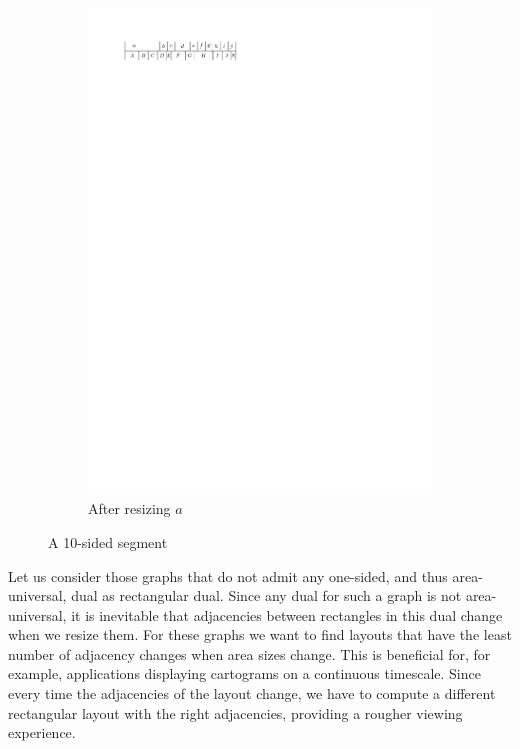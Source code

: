 \begin{figure}[t]
\begin{subfigure}[b]{0.45 \textwidth}
      \includegraphics[width=\textwidth]{introduction/img/10sidedAfter.pdf}
      \caption{After resizing $a$}
      \label{fig:intro:10sidedAfter}
    \end{subfigure}
    \quad
    \caption{A 10-sided segment}
    \label{fig:intro:10sided}
  \end{figure}
  Let us consider those graphs that do not admit any one-sided, and thus area-universal, dual as rectangular dual.
  Since any dual for such a graph is not area-universal, it is inevitable that adjacencies between rectangles in this dual change when we resize them.
  For these graphs we want to find layouts that have the least number of adjacency changes when area sizes change.
  This is beneficial for, for example, applications displaying cartograms on a continuous timescale.
  Since every time the adjacencies of the layout change, we have to compute a different rectangular layout with the right adjacencies, providing a rougher viewing experience.

